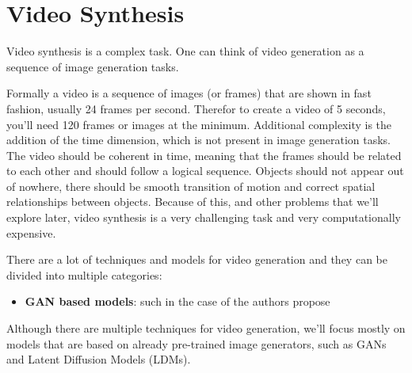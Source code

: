 \section{Video Synthesis}
\label{sec:video_synthesis}

Video synthesis is a complex task. One can think of video generation as a sequence of image generation tasks. 

Formally a video is a sequence of images (or frames) that are shown in fast fashion, usually 24 frames per second. Therefor to create a video of 5 seconds, you'll need 120 frames or images at the minimum. Additional complexity is the addition of the time dimension, which is not present in image generation tasks. The video should be coherent in time, meaning that the frames should be related to each other and should follow a logical sequence. Objects should not appear out of nowhere, there should be smooth transition of motion and correct spatial relationships between objects. Because of this, and other problems that we'll explore later, video synthesis is a very challenging task and very computationally expensive.

There are a lot of techniques and models for video generation and they can be divided into multiple categories:

\begin{itemize}
    \item \textbf{GAN based models}: such in the case of \cite{chu2020learning} the authors propose 
\end{itemize}

Although there are multiple techniques for video generation, we'll focus mostly on models that are based on already pre-trained image generators, such as GANs and Latent Diffusion Models (LDMs).